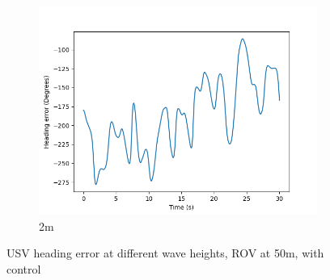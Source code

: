 \documentclass[class=article, crop=false]{standalone}
\begin{document}
\begin{figure}
\begin{subfigure}[b]{0.48\textwidth}
        \includegraphics{scenario1/rov-50m/2.0m/usv_heading_error_controlled}
        \caption{2m}
        \label{}
    \end{subfigure}

    \caption{USV heading error at different wave heights, ROV at 50m, with control}
\end{figure}
\end{document}
